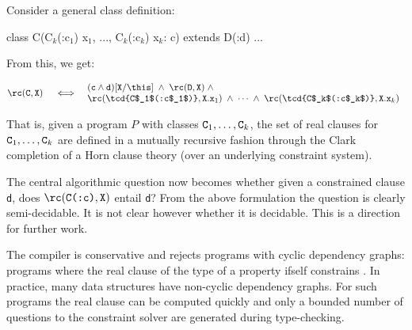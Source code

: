 Consider a general class definition:
\begin{displayxten}
class C(C$_k$(:c$_1$) x$_1$, ..., C$_k$(:c$_k$) x$_k$: c) extends D(:d)
      { ... }
\end{displayxten}

\noindent From this, we get:

$$\rc({\tt C},{\tt X}) ~~~ \iff \!\!\!\!
\begin{array}{l}
\quad  ({\tt c} \wedge {\tt d})[{\tt X}/\this]
\;\wedge\; \rc({\tt D},{\tt X}) \;\wedge \\
\quad  \rc(\mbox{\tcd{C$_1$(:c$_1$)}}, {\tt X.x}_1) \;\wedge\; \cdots
\;\wedge\; \rc(\mbox{\tcd{C$_k$(:c$_k$)}}, {\tt X.x}_k)
\end{array}
$$

That is, given a program $P$ with classes ${\tt C}_1,\ldots, {\tt
C}_k$, the set of real clauses for ${\tt C}_1,\ldots, {\tt C}_k$ are
defined in a mutually recursive fashion through the Clark completion
of a Horn clause theory (over an underlying constraint system).

The central algorithmic question now becomes whether given a
constrained clause {\tt d}, does $\rc(\mbox{\tt C(:c)},{\tt X})$ entail {\tt d}? 
%
From the above formulation the question is clearly semi-decidable. It
is not clear however whether it is decidable. This is a direction for
further work.

The \Xten{} compiler is conservative and rejects
programs with cyclic dependency graphs: programs where the real
clause of the type
of a property  ifself constrains .
%
In practice, many data structures have non-cyclic dependency
graphs. For such programs the real clause can be computed quickly and
only a bounded number of questions to the constraint solver are
generated during type-checking.



